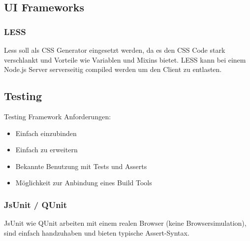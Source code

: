 		\subsection{UI Frameworks}
			\subsubsection{LESS}
				Less soll als CSS Generator eingesetzt werden, da es den CSS Code stark verschlankt und Vorteile wie Variablen und Mixins bietet. LESS kann bei einem Node.js Server serverseitig compiled werden um den Client zu entlasten.
				
		\subsection{Testing}
			Testing Framework Anforderungen:
			\begin{itemize}
				\item Einfach einzubinden
				\item Einfach zu erweitern
				\item Bekannte Benutzung mit Tests und Asserts
				\item Möglichkeit zur Anbindung eines Build Tools
			\end{itemize}

			\subsubsection{JsUnit / QUnit}
				JsUnit wie QUnit arbeiten mit einem realen Browser (keine Browsersimulation), 
				sind einfach handzuhaben und bieten typische Assert-Syntax.
				
				
